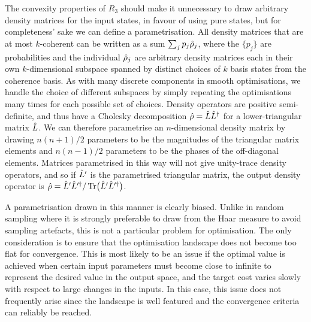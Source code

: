 The convexity properties of $R_3$ should make it unnecessary to draw arbitrary density matrices for the input states, in favour of using pure states, but for completeness' sake we can define a parametrisation.
All density matrices that are at most $k$-coherent can be written as a sum $\sum_j p_j\hat{\rho}_j$, where the $\{p_j\}$ are probabilities and the individual $\hat{\rho}_j$ are arbitrary density matrices each in their own $k$-dimensional subspace spanned by distinct choices of $k$ basis states from the coherence basis.
As with many discrete components in smooth optimisations, we handle the choice of different subspaces by simply repeating the optimisations many times for each possible set of choices.
Density operators are positive semi-definite, and thus have a Cholesky decomposition $\hat{\rho} = \hat{L}\hat{L}^\dagger$ for a lower-triangular matrix $\hat{L}$.
We can therefore parametrise an $n$-dimensional density matrix by drawing $n(n+1)/2$ parameters to be the magnitudes of the triangular matrix elements and $n(n-1)/2$ parameters to be the phases of the off-diagonal elements.
Matrices parametrised in this way will not give unity-trace density operators, and so if $\hat{L}'$ is the parametrised triangular matrix, the output density operator is $\hat{\rho} = \hat{L}'\hat{L}'^\dagger/\operatorname{Tr}\bigl(\hat{L}'\hat{L}'^\dagger\bigr)$.

A parametrisation drawn in this manner is clearly biased.
Unlike in random sampling where it is strongly preferable to draw from the Haar measure to avoid sampling artefacts, this is not a particular problem for optimisation.
The only consideration is to ensure that the optimisation landscape does not become too flat for convergence.
This is most likely to be an issue if the optimal value is achieved when certain input parameters must become close to infinite to represent the desired value in the output space, and the target cost varies slowly with respect to large changes in the inputs.
In this case, this issue does not frequently arise since the landscape is well featured and the convergence criteria can reliably be reached.

